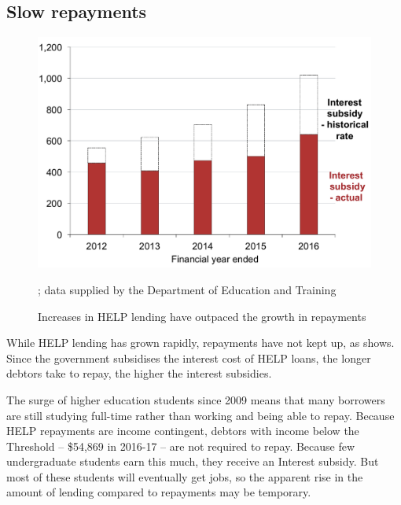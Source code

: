 \documentclass[embargoed]{grattan}
\begin{document}
\subsection{Slow repayments }\label{slow-repayments}

\begin{figure}
\caption{Increases in \gls{HELP} lending have outpaced the growth in repayments}\label{fig:fig7-increases-help-lending-outpaced-growth-repayments}


\includegraphics[page=7]{atlas/Chartpack.pdf}

%
{\textcites{Education2015Highereducationreport}{Education20152014VETFEEa}; data supplied by the Department of Education and Training}
\end{figure}

While \gls{HELP} lending has grown rapidly, repayments have not kept up, as  shows.
Since the government subsidises the interest cost of \gls{HELP} loans, the longer debtors take to repay, the higher the interest subsidies.

The surge of higher education students since 2009 means that many borrowers are still studying full-time rather than working and being able to repay.
Because \gls{HELP} repayments are income contingent, debtors with income below the \gls{Threshold} -- \$54,869 in 2016-17 -- are not required to repay.
Because few undergraduate students earn this much, they receive an \gls{Interest subsidy}.
But most of these students will eventually get jobs, so the apparent rise in the amount of lending compared to repayments may be temporary.
\end{document}
